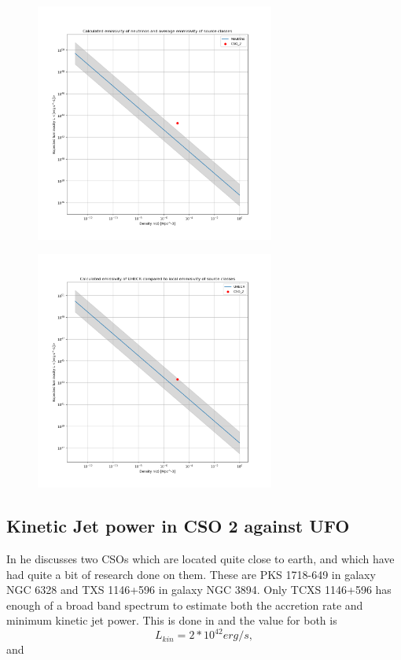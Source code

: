 \documentclass[11pt]{article}
\begin{document}
\begin{figure}
    \centering
    \includegraphics[width=0.7\textwidth]{Plots/L_n_neut_calc_cso.png}
\end{figure}

\begin{figure}
    \centering
    \includegraphics[width=0.7\textwidth]{Plots/L_n_uhecr_calc_cso.png}

\end{figure}



\subsection*{Kinetic Jet power in CSO 2 against UFO}
In \cite{bronzini2024investigating} he discusses two CSOs which are located quite close to earth, and which have had 
quite a bit of research done on them. These are PKS 1718-649 in galaxy NGC 6328 and TXS 1146+596  in galaxy NGC 3894. Only TCXS 1146+596 has enough of a broad band spectrum to
estimate both the accretion rate and minimum kinetic jet power. This is done in \cite{Balasubramaniam_2021} and the value for both is 
\begin{equation}
    L_{kin} = 2 * 10^{42} erg/s,
\end{equation}
and 
\end{document}

